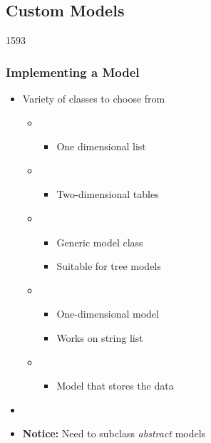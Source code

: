 %
%
%
%

\subsection{Custom Models}

\begin{slide}{1593}
\frametitle{Implementing a Model}
\begin{itemize}
\item Variety of classes to choose from
  \begin{itemize}
  \item {}
    \begin{itemize}
    \item One dimensional list
    \end{itemize}
  \item {}
    \begin{itemize}
    \item Two-dimensional tables
    \end{itemize}
  \item {}
    \begin{itemize}
    \item Generic model class
    \item Suitable for tree models
    \end{itemize}
  \item {}
    \begin{itemize}
    \item One-dimensional model
    \item Works on string list
    \end{itemize}
  \item {}
    \begin{itemize}
    \item Model that stores the data
    \end{itemize}
 \end{itemize}
\item[]
\item \textbf{Notice:} Need to subclass \textit{abstract} models
\end{itemize}
\end{slide}

